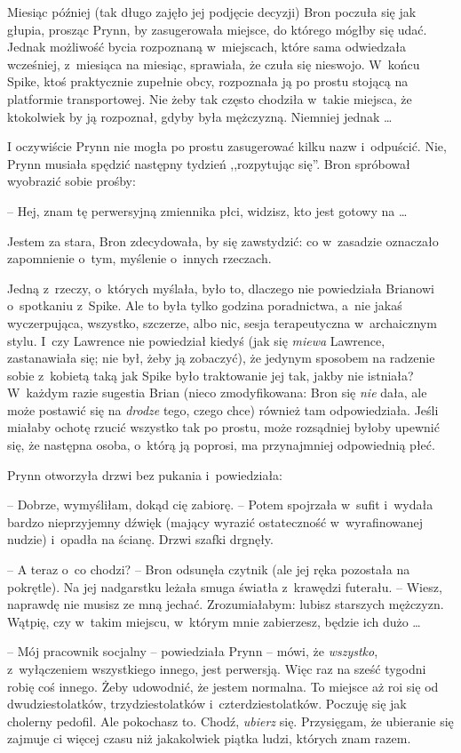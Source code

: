 \documentclass[oneside,polish,11pt,rmheadings]{mwbk}
\begin{document}
Miesiąc później (tak długo zajęło jej podjęcie decyzji) Bron poczuła się jak głupia, prosząc Prynn, by zasugerowała miejsce, do którego mógłby się udać. Jednak możliwość bycia rozpoznaną w~miejscach, które sama odwiedzała wcześniej, z~miesiąca na miesiąc, sprawiała, że czuła się nieswojo. W~końcu Spike, ktoś praktycznie zupełnie obcy, rozpoznała ją po prostu stojącą na platformie transportowej. Nie żeby tak często chodziła w~takie miejsca, że ktokolwiek by ją rozpoznał, gdyby była mężczyzną. Niemniej jednak  \ldots  

I oczywiście Prynn nie mogła po prostu zasugerować kilku nazw i~odpuścić. Nie, Prynn musiała spędzić następny tydzień ,,rozpytując się''. Bron spróbował wyobrazić sobie prośby:  

-- Hej, znam tę perwersyjną zmiennika płci, widzisz, kto jest gotowy na \ldots  

Jestem za stara, Bron zdecydowała, by się zawstydzić: co w~zasadzie oznaczało zapomnienie o~tym, myślenie o~innych rzeczach. 

Jedną z~rzeczy, o~których myślała, było to, dlaczego nie powiedziała Brianowi o~spotkaniu z~Spike. Ale to była tylko godzina poradnictwa, a~nie jakaś wyczerpująca, wszystko, szczerze, albo nic, sesja terapeutyczna w~archaicznym stylu. I~czy Lawrence nie powiedział kiedyś (jak się \textit{miewa }Lawrence, zastanawiała się; nie był, żeby ją zobaczyć), że jedynym sposobem na radzenie sobie z~kobietą taką jak Spike było traktowanie jej tak, jakby nie istniała? W~każdym razie sugestia Brian (nieco zmodyfikowana: Bron się \textit{nie }dała, ale może postawić się na \textit{drodze }tego, czego chce) również tam odpowiedziała. Jeśli miałaby ochotę rzucić wszystko tak po prostu, może rozsądniej byłoby upewnić się, że następna osoba, o~którą ją poprosi, ma przynajmniej odpowiednią płeć. 

Prynn otworzyła drzwi bez pukania i~powiedziała: 

-- Dobrze, wymyśliłam, dokąd cię zabiorę. --  Potem spojrzała w~sufit i~wydała bardzo nieprzyjemny dźwięk (mający wyrazić ostateczność w~wyrafinowanej nudzie) i~opadła na ścianę. Drzwi szafki drgnęły. 

-- A teraz o~co chodzi? -- Bron odsunęła czytnik (ale jej ręka pozostała na pokrętle). Na jej nadgarstku leżała smuga światła z~krawędzi futerału. -- Wiesz, naprawdę nie musisz ze mną jechać. Zrozumiałabym: lubisz starszych mężczyzn. Wątpię, czy w~takim miejscu, w~którym mnie zabierzesz, będzie ich dużo \ldots  

-- Mój pracownik socjalny -- powiedziała Prynn -- mówi, że \textit{wszystko}, z~wyłączeniem wszystkiego innego, jest perwersją. Więc raz na sześć tygodni robię coś innego. Żeby udowodnić, że jestem normalna. To miejsce aż roi się od dwudziestolatków, trzydziestolatków i~czterdziestolatków. Poczuję się jak cholerny pedofil. Ale pokochasz to. Chodź, \textit{ubierz }się. Przysięgam, że ubieranie się zajmuje ci więcej czasu niż jakakolwiek piątka ludzi, których znam razem. 
\end{document}
